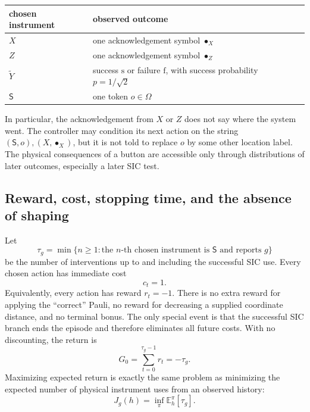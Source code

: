 \documentclass[11pt]{article}
\theoremstyle{definition}
\theoremstyle{remark}
\newcommand{\E}{\mathbb E}
\begin{document}
\begin{center}
\small
\begin{tabularx}{\textwidth}{>{\raggedright\arraybackslash}p{1.25cm}
 >{\raggedright\arraybackslash}p{3.0cm}X}
\toprule
chosen instrument & observed outcome\\
\midrule
\(X\) & one acknowledgement symbol \(\bullet_X\)\\
\(Z\) & one acknowledgement symbol \(\bullet_Z\)\\
\(\widetilde Y\) & success \(\mathrm s\) or failure \(\mathrm f\), with
success probability \(p=1/\sqrt2\)\\
\(\mathsf S\) & one token \(o\in\Omega\)\\
\bottomrule
\end{tabularx}
\end{center}

In particular, the acknowledgement from \(X\) or \(Z\) does not say where the
system went.  The controller may condition its next action on the string
\((\mathsf S,o), (X,\bullet_X)\), but it is not told to replace \(o\) by some
other location label.  The physical consequences of a button are accessible
only through distributions of later outcomes, especially a later SIC test.

\subsection{Reward, cost, stopping time, and the absence of shaping}

Let
\[
 \tau_g=\min\{n\ge1:\text{the \(n\)-th chosen instrument is
 \(\mathsf S\) and reports \(g\)}\}
\]
be the number of interventions up to and including the successful SIC use.
Every chosen action has immediate cost
\begin{equation}
 c_t=1.
 \label{eq:unit-intervention-cost}
\end{equation}
Equivalently, every action has reward \(r_t=-1\). There is no extra reward
for applying the ``correct'' Pauli, no reward for decreasing a supplied
coordinate distance, and no terminal bonus. The only special event is that
the successful SIC branch ends the episode and therefore eliminates all
future costs. With no discounting, the return is
\begin{equation}
 G_0=\sum_{t=0}^{\tau_g-1}r_t=-\tau_g.
 \label{eq:undiscounted-return}
\end{equation}
Maximizing expected return is exactly the same problem as minimizing the
expected number of physical instrument uses from an observed history:
\begin{equation}
 J_g(h)=\inf_\pi\E_h^\pi[\tau_g].
 \label{eq:hitting-value}
\end{equation}
\end{document}

